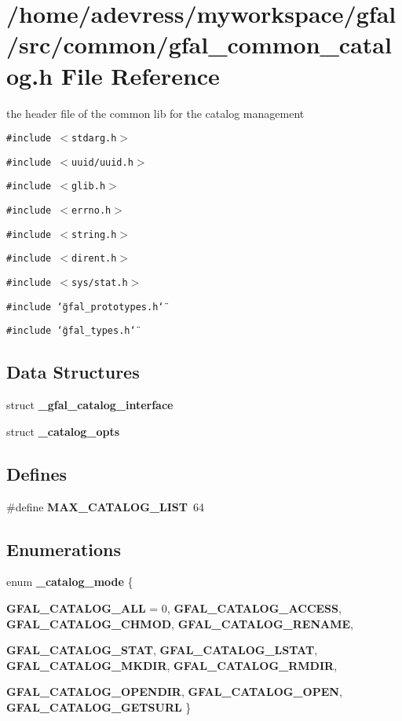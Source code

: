 \section{/home/adevress/myworkspace/gfal/src/common/gfal\_\-common\_\-catalog.h File Reference}
\label{gfal__common__catalog_8h}
the header file of the common lib for the catalog management 

{\tt \#include $<$stdarg.h$>$}\par
{\tt \#include $<$uuid/uuid.h$>$}\par
{\tt \#include $<$glib.h$>$}\par
{\tt \#include $<$errno.h$>$}\par
{\tt \#include $<$string.h$>$}\par
{\tt \#include $<$dirent.h$>$}\par
{\tt \#include $<$sys/stat.h$>$}\par
{\tt \#include \char`\"{}gfal\_\-prototypes.h\char`\"{}}\par
{\tt \#include \char`\"{}gfal\_\-types.h\char`\"{}}\par
\subsection*{Data Structures}
\begin{CompactItemize}
\item 
struct \textbf{\_\-gfal\_\-catalog\_\-interface}
\item 
struct \bf{\_\-catalog\_\-opts}
\end{CompactItemize}
\subsection*{Defines}
\begin{CompactItemize}
\item 
\#define \textbf{MAX\_\-CATALOG\_\-LIST}~64\label{gfal__common__catalog_8h_c39f705683e893b91f559704ee2a707e}

\end{CompactItemize}
\subsection*{Enumerations}
\begin{CompactItemize}
\item 
enum \textbf{\_\-catalog\_\-mode} \{ \par
\textbf{GFAL\_\-CATALOG\_\-ALL} = 0, 
\textbf{GFAL\_\-CATALOG\_\-ACCESS}, 
\textbf{GFAL\_\-CATALOG\_\-CHMOD}, 
\textbf{GFAL\_\-CATALOG\_\-RENAME}, 
\par
\textbf{GFAL\_\-CATALOG\_\-STAT}, 
\textbf{GFAL\_\-CATALOG\_\-LSTAT}, 
\textbf{GFAL\_\-CATALOG\_\-MKDIR}, 
\textbf{GFAL\_\-CATALOG\_\-RMDIR}, 
\par
\textbf{GFAL\_\-CATALOG\_\-OPENDIR}, 
\textbf{GFAL\_\-CATALOG\_\-OPEN}, 
\textbf{GFAL\_\-CATALOG\_\-GETSURL}
 \}
\end{CompactItemize}
